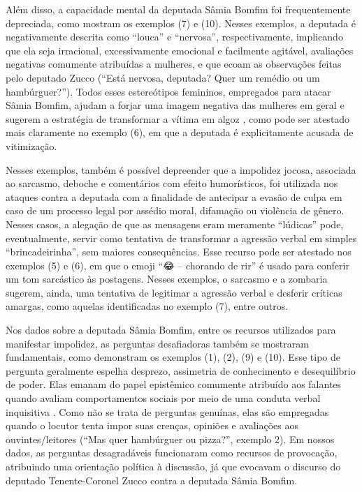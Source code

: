 \documentclass[portuguese]{textolivre}
\begin{document}
Além disso, a capacidade mental da deputada Sâmia Bomfim foi frequentemente depreciada, como mostram os exemplos (7) e (10). Nesses exemplos, a deputada é negativamente descrita como ``louca'' e ``nervosa'', respectivamente, implicando que ela seja irracional, excessivamente emocional e facilmente agitável, avaliações negativas comumente atribuídas a mulheres, e que ecoam as observações feitas pelo deputado Zucco (``Está nervosa, deputada? Quer um remédio ou um hambúrguer?''). Todos esses estereótipos femininos, empregados para atacar Sâmia Bomfim, ajudam a forjar uma imagem negativa das mulheres em geral e sugerem a estratégia de transformar a vítima em algoz \cite{wodak2018}, como pode ser atestado mais claramente no exemplo (6), em que a deputada é explicitamente acusada de vitimização.

Nesses exemplos, também é possível depreender que a impolidez jocosa, associada ao sarcasmo, deboche e comentários com efeito humorísticos, foi utilizada nos ataques contra a deputada com a finalidade de antecipar a evasão de culpa em caso de um processo legal por assédio moral, difamação ou violência de gênero. Nesses casos, a alegação de que as mensagens eram meramente ``lúdicas'' pode, eventualmente, servir como tentativa de transformar a agressão verbal em simples ``brincadeirinha'', sem maiores consequências. Esse recurso pode ser atestado nos exemplos (5) e (6), em que o emoji ``{\Symbola 😂}
– chorando de rir'' é usado para conferir um tom sarcástico às postagens. Nesses exemplos, o sarcasmo e a zombaria sugerem, ainda, uma tentativa de legitimar a agressão verbal e desferir críticas amargas, como aquelas identificadas no exemplo (7), entre outros.

Nos dados sobre a deputada Sâmia Bomfim, entre os recursos utilizados para manifestar impolidez, as perguntas desafiadoras \cite{culpeper2010, culpeper2011} também se mostraram fundamentais, como demonstram os exemplos (1), (2), (9) e (10). Esse tipo de pergunta geralmente espelha desprezo, assimetria de conhecimento e desequilíbrio de poder. Elas emanam do papel epistêmico comumente atribuído aos falantes quando avaliam comportamentos sociais por meio de uma conduta verbal inquisitiva \cite{raymond2006, tantucci2023}. Como não se trata de perguntas genuínas, elas são empregadas quando o locutor tenta impor suas crenças, opiniões e avaliações aos ouvintes/leitores (``Mas quer hambúrguer ou pizza?'', exemplo 2). Em nossos dados, as perguntas desagradáveis funcionaram como recursos de provocação, atribuindo uma orientação política à discussão, já que evocavam o discurso do deputado Tenente-Coronel Zucco contra a deputada Sâmia Bomfim.
\end{document}
